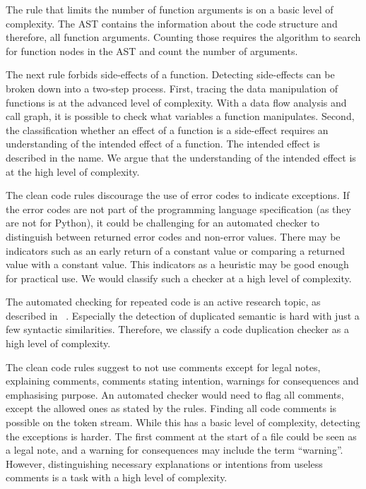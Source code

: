 The rule that limits the number of function arguments is on a basic level of complexity. The AST contains the information about the code structure and therefore, all function arguments. Counting those requires the algorithm to search for function nodes in the AST and count the number of arguments.

The next rule forbids side-effects of a function. Detecting side-effects can be broken down into a two-step process.
First, tracing the data manipulation of functions is at the advanced level of complexity. With a data flow analysis and call graph, it is possible to check what variables a function manipulates. Second, the classification whether an effect of a function is a side-effect requires an understanding of the intended effect of a function. The intended effect is described in the name. We argue that the understanding of the intended effect is at the high level of complexity. 

The clean code rules discourage the use of error codes to indicate exceptions. If the error codes are not part of the programming language specification (as they are not for Python), it could be challenging for an automated checker to distinguish between returned error codes and non-error values. There may be indicators such as an early return of a constant value or comparing a returned value with a constant value. This indicators as a heuristic may be good enough for practical use. We would classify such a checker at a high level of complexity.

The automated checking for repeated code is an active research topic, as described in ~\cite{buch_learning-based_2019,saini_oreo_2018}. Especially the detection of duplicated semantic is hard with just a few syntactic similarities. Therefore, we classify a code duplication checker as a high level of complexity.

The clean code rules suggest to not use comments except for legal notes, explaining comments, comments stating intention, warnings for consequences and emphasising purpose. An automated checker would need to flag all comments, except the allowed ones as stated by the rules. Finding all code comments is possible on the token stream. While this has a basic level of complexity, detecting the exceptions is harder. The first comment at the start of a file could be seen as a legal note, and a warning for consequences may include the term \enquote{warning}. However, distinguishing necessary explanations or intentions from useless comments is a task with a high level of complexity.

